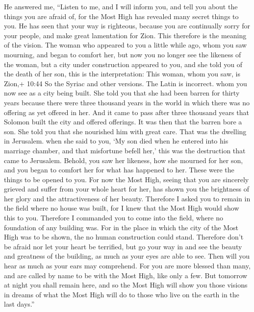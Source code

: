  He answered me, ``Listen to me, and I will inform you, and
tell you about the things you are afraid of, for the Most High has
revealed many secret things to you.  He has seen that your
way is righteous, because you are continually sorry for your people, and
make great lamentation for Zion.  This therefore is the
meaning of the vision.  The woman who appeared to you a
little while ago, whom you saw mourning, and began to comfort her,
 but now you no longer see the likeness of the woman, but a
city under construction appeared to you,  and she told you
of the death of her son, this is the interpretation:  This
woman, whom you saw, is Zion,+ 10:44 So the Syriac and other versions.
The Latin is incorrect. whom you now see as a city being built.
 She told you that she had been barren for thirty years
because there were three thousand years in the world in which there was
no offering as yet offered in her.  And it came to pass
after three thousand years that Solomon built the city and offered
offerings. It was then that the barren bore a son.  She
told you that she nourished him with great care. That was the dwelling
in Jerusalem.  when she said to you, `My son died when he
entered into his marriage chamber, and that misfortune befell her,' this
was the destruction that came to Jerusalem.  Behold, you
saw her likeness, how she mourned for her son, and you began to comfort
her for what has happened to her. These were the things to be opened to
you.  For now the Most High, seeing that you are sincerely
grieved and suffer from your whole heart for her, has shown you the
brightness of her glory and the attractiveness of her beauty.
 Therefore I asked you to remain in the field where no
house was built,  for I knew that the Most High would show
this to you.  Therefore I commanded you to come into the
field, where no foundation of any building was.  For in the
place in which the city of the Most High was to be shown, the no human
construction could stand.  Therefore don't be afraid nor
let your heart be terrified, but go your way in and see the beauty and
greatness of the building, as much as your eyes are able to see.
 Then will you hear as much as your ears may comprehend.
 For you are more blessed than many, and are called by name
to be with the Most High, like only a few.  But tomorrow at
night you shall remain here,  and so the Most High will
show you those visions in dreams of what the Most High will do to those
who live on the earth in the last days.''

